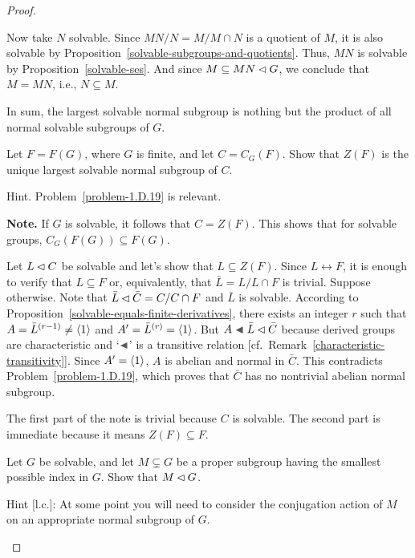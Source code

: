 \begin{proof}
\begin{solution}
Now take $N$ solvable. Since $MN/N=M/M\cap N$ is a quotient of $M$, it is also solvable by Proposition~\ref{solvable-subgroups-and-quotients}. Thus, $MN$ is solvable by Proposition~\ref{solvable-ses}. And since $M\subseteq MN\lhd G$, we conclude that $M=MN$, i.e., $N\subseteq M$. 

In sum, the largest solvable normal subgroup is nothing but the product of all normal solvable subgroups of $G$. \end{solution}

\begin{probl}
    Let\/ $F = F(G)$, where\/ $G$ is finite, and let\/ $C = C_G(F)$. Show that\/ $Z(F)$ is the unique largest solvable normal subgroup of\/ $C$.

    {\upshape Hint. Problem~\ref{problem-1.D.19} is relevant.}
    
    \textrm{\normalfont\textbf{Note.} If $G$ is solvable, it follows that $C = Z(F)$. This shows that for solvable groups, $C_G(F(G))\subseteq F(G)$.}
\end{probl}

\begin{solution} 
Let $L\lhd C$ be solvable and let's show that $L\subseteq Z(F)$. Since $L\leftrightarrow F$, it is enough to verify that $L\subseteq F$ or, equivalently, that $\bar L=L/L\cap F$ is trivial. Suppose otherwise. Note that $\bar L\lhd\bar C=C/C\cap F$ and $\bar L$ is solvable. According to Proposition~\ref{solvable-equals-finite-derivatives}, there exists an integer $r$ such that $A=\bar L^{(r-1)}\ne\langle1\rangle$ and $A'=\bar L^{(r)}=\langle1\rangle$. But $A\ch\bar L\normal\bar C$ because derived groups are characteristic and `$\ch$' is a transitive relation [cf.~Remark~\ref{characteristic-transitivity}]. Since $A'=\langle1\rangle$, $A$ is abelian and normal in $\bar C$. This contradicts Problem~\ref{problem-1.D.19}, which proves that $\bar C$ has no nontrivial abelian normal subgroup.

The first part of the note is trivial because $C$ is solvable. The second part is immediate because it means $Z(F)\subseteq F$.  \end{solution}

\begin{probl}
    {\upshape[Berkovich]} Let\/ $G$ be solvable, and let\/ $M\varsubsetneq G$ be a proper subgroup having the smallest possible index in\/ $G$. Show that\/ $M\lhd G$.

    {\upshape Hint [l.c.]: At some point you will need to consider the conjugation action of $M$ on an appropriate normal subgroup of $G$.}
\end{probl}


\end{proof}
